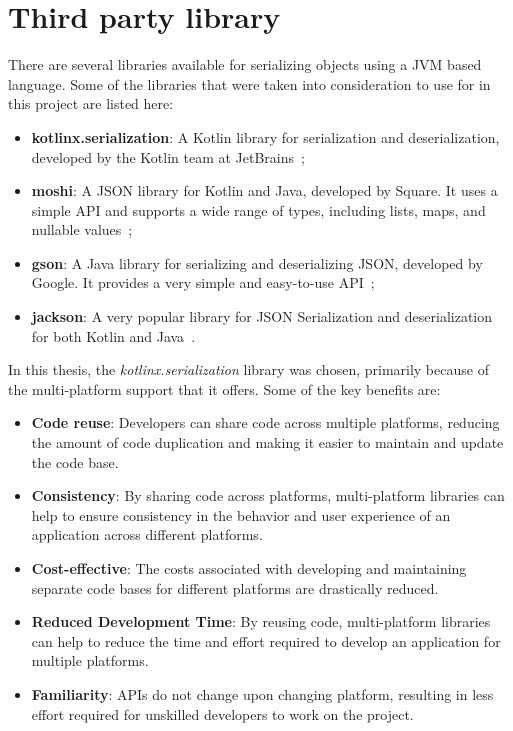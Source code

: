 \section{Third party library}
\label{sec:third-party-library}
There are several libraries available for serializing objects using a JVM based language. Some of the libraries that were taken into consideration to use for in this project are listed here:
\begin{itemize}
	\item \textbf{kotlinx.serialization}: A Kotlin library for serialization and deserialization, developed by the Kotlin team at JetBrains~\cite{Kotlinko43:online};
	\item \textbf{moshi}: A JSON library for Kotlin and Java, developed by Square. It uses a simple API and supports a wide range of types, including lists, maps, and nullable values~\cite{squaremo84:online};
	\item \textbf{gson}: A Java library for serializing and deserializing JSON, developed by Google. It provides
	a very simple and easy-to-use API~\cite{googlegs30:online};
	\item \textbf{jackson}: A very popular library for JSON Serialization and deserialization for both Kotlin and Java~\cite{FasterXM63:online}.
\end{itemize}

In this thesis, the \textit{kotlinx.serialization} library was chosen, primarily because of the multi-platform support that it offers. Some of the key benefits are:

\begin{itemize}
	\item \textbf{Code reuse}: Developers can share code across multiple platforms, reducing the amount of code duplication and making it easier to maintain and update the code base.
	\item \textbf{Consistency}: By sharing code across platforms, multi-platform libraries can help to ensure consistency in the behavior and user experience of an application across different platforms.
	\item \textbf{Cost-effective}: The costs associated with developing and maintaining separate code bases for different platforms are drastically reduced.
	\item \textbf{Reduced Development Time}: By reusing code, multi-platform libraries can help to reduce the time and effort required to develop an application for multiple platforms.
	\item \textbf{Familiarity}: APIs do not change upon changing platform, resulting in less effort required for unskilled developers to work on the project.
\end{itemize}

